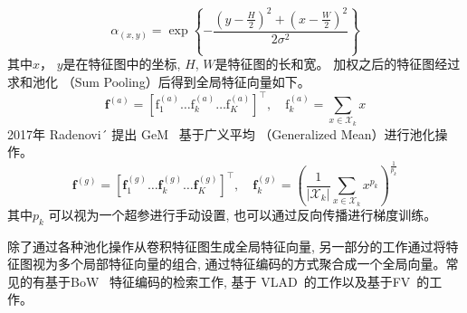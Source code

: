 \begin{equation}
    \alpha_{(x, y)}=\exp \left\{-\frac{\left(y-\frac{H}{2}\right)^2+\left(x-\frac{W}{2}\right)^2}{2 \sigma^2}\right\}
    \label{eq:gaussianweight}
\end{equation}
其中$x$， $y$是在特征图中的坐标, $H$, $W$是特征图的长和宽。 加权之后的特征图经过求和池化 （Sum Pooling）后得到全局特征向量如下。
\begin{equation}
    \mathbf{f}^{(a)}=\left[\mathrm{f}_1^{(a)} \ldots \mathrm{f}_k^{(a)} \ldots \mathrm{f}_K^{(a)}\right]^{\top}, \quad \mathrm{f}_k^{(a)}= \sum_{x \in \mathcal{X}_k} x
\end{equation}
2017年 Radenovi´ 提出 GeM~\cite{radenovic2018fine} 基于广义平均 （Generalized Mean）进行池化操作。
\begin{equation}
    \mathbf{f}^{(g)}=\left[\mathbf{f}_1^{(g)} \ldots \mathbf{f}_k^{(g)} \ldots \mathbf{f}_K^{(g)}\right]^{\top}, \quad \mathbf{f}_k^{(g)}=\left(\frac{1}{\left|\mathcal{X}_k\right|} \sum_{x \in \mathcal{X}_k} x^{p_k}\right)^{\frac{1}{p_k}}
\end{equation}
其中$p_k$ 可以视为一个超参进行手动设置, 也可以通过反向传播进行梯度训练。\par
除了通过各种池化操作从卷积特征图生成全局特征向量, 另一部分的工作通过将特征图视为多个局部特征向量的组合, 通过特征编码的方式聚合成一个全局向量。常见的有基于BoW ~\cite{li2016exploiting, mohedano2016bags, zheng2016accurate}特征编码的检索工作, 基于 VLAD~\cite{gong2014multi, yue2015exploiting}的工作以及基于FV~\cite{jegou2011aggregating, sanchez2013image}的工作。 

